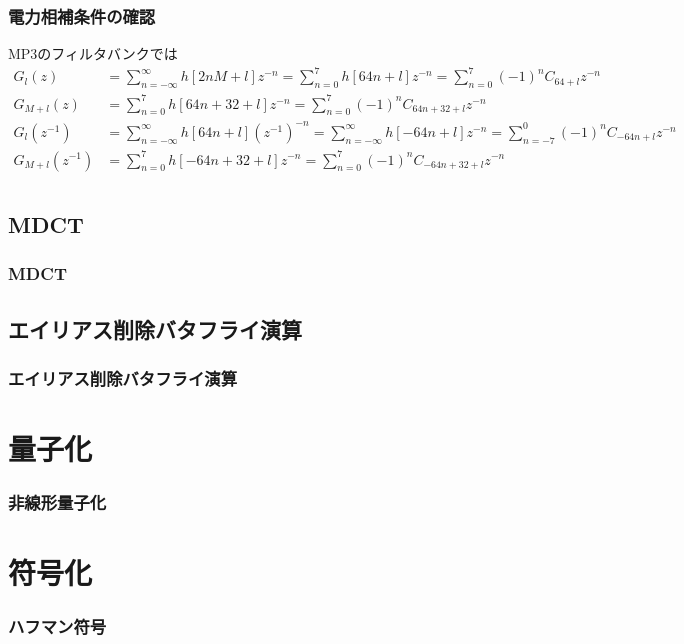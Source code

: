\documentclass[14pt,xcolor=dvipsnames,table,dvipdfmx]{beamer}
\begin{document}
\begin{frame}[c]
    \frametitle{電力相補条件の確認}
    MP3のフィルタバンクでは
    \scriptsize
    \begin{align*}
        G_{l}(z) &= \sum_{n = -\infty}^{\infty} h[2nM + l] z^{-n} = \sum_{n = 0}^{7} h[64n + l] z^{-n} = \sum_{n = 0}^{7} (-1)^{n} C_{64 + l} z^{-n} \\
        G_{M+l}(z) &= \sum_{n = 0}^{7} h[64n + 32 + l] z^{-n} = \sum_{n = 0}^{7} (-1)^{n} C_{64n + 32 + l} z^{-n} \\
        G_{l}(z^{-1}) &= \sum_{n = -\infty}^{\infty} h[64n + l] (z^{-1})^{-n} = \sum_{n = -\infty}^{\infty} h[-64n + l] z^{-n} = \sum_{n = -7}^{0} (-1)^{n} C_{-64n + l} z^{-n} \\
        G_{M+l}(z^{-1}) &= \sum_{n = 0}^{7} h[-64n + 32 + l] z^{-n} = \sum_{n = 0}^{7} (-1)^{n} C_{-64n + 32 + l} z^{-n} \\
    \end{align*}
\end{frame}

\subsection{MDCT}

\begin{frame}[c]
    \frametitle{MDCT}
\end{frame}

\subsection{エイリアス削除バタフライ演算}

\begin{frame}[c]
    \frametitle{エイリアス削除バタフライ演算}
\end{frame}

\section{量子化}

\begin{frame}[c]
    \frametitle{非線形量子化}
\end{frame}

\section{符号化}

\begin{frame}[c]
    \frametitle{ハフマン符号}
\end{frame}
\end{document}
